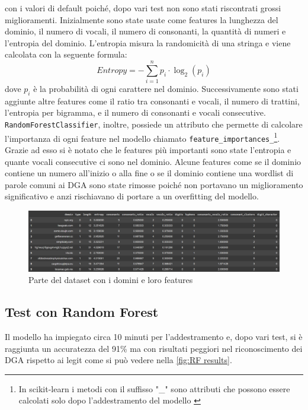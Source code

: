 \documentclass[12pt,a4paper,openright,twoside]{book}
\begin{document}
con i valori di default poiché, dopo vari test non sono stati riscontrati grossi miglioramenti.
Inizialmente sono state usate come features la lunghezza del dominio, il numero di vocali,
il numero di consonanti, la quantità di numeri e l'entropia del dominio.
L'entropia misura la randomicità di una stringa e viene calcolata con la seguente formula:
\begin{equation}
    Entropy = -\sum_{i=1}^{n} p_i \cdot \log_2(p_i)
\end{equation}
dove $p_i$ è la probabilità di ogni carattere nel dominio. \hfil \break
Successivamente sono stati aggiunte altre features come il ratio tra consonanti e vocali,
il numero di trattini, l'entropia per bigramma, e il numero di consonanti e vocali consecutive.
\texttt{RandomForestClassifier}, inoltre, possiede un attributo che permette di calcolare l'importanza di ogni feature nel modello
chiamato \texttt{feature\_importances\_}\footnote{In scikit-learn i metodi con il suffisso "\_" sono attributi che possono essere calcolati solo dopo l'addestramento del modello \cite{scikit_learn_underscore}}.
Grazie ad esso si è notato che le features più importanti sono state
l'entropia e quante vocali consecutive ci sono nel dominio.
Alcune features come se il dominio contiene un numero all'inizio o alla fine
o se il dominio contiene una wordlist di parole comuni ai DGA sono state
rimosse poiché non portavano un miglioramento significativo e anzi 
rischiavano di portare a un overfitting del modello.
\begin{figure}[H]
    \centering
    \includegraphics[width=.8\linewidth]{figures/RF_feature.png}
    \caption{Parte del dataset con i domini e loro features}
    \label{fig:RF feature}
\end{figure}

\subsection{Test con Random Forest}
Il modello ha impiegato circa 10 minuti per l'addestramento e, dopo vari test,
si è raggiunta un accuratezza del 91\% ma
con risultati peggiori nel riconoscimento dei DGA rispetto ai legit come si può vedere nella \cref{fig:RF results}.
\end{document}
